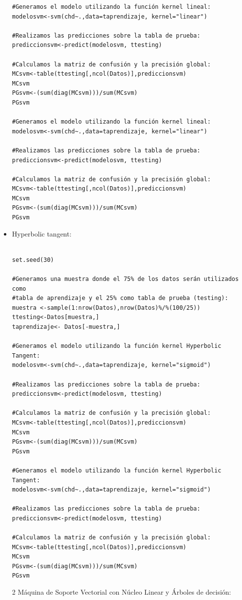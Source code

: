 \documentclass[11pt,a4paper]{report}
\begin{document}
\begin{itemize}
\begin{verbatim}
#Generamos el modelo utilizando la función kernel lineal:
modelosvm<-svm(chd~.,data=taprendizaje, kernel="linear") 

#Realizamos las predicciones sobre la tabla de prueba:
prediccionsvm<-predict(modelosvm, ttesting) 

#Calculamos la matriz de confusión y la precisión global:
MCsvm<-table(ttesting[,ncol(Datos)],prediccionsvm) 
MCsvm
PGsvm<-(sum(diag(MCsvm)))/sum(MCsvm)
PGsvm

#Generamos el modelo utilizando la función kernel lineal:
modelosvm<-svm(chd~.,data=taprendizaje, kernel="linear") 

#Realizamos las predicciones sobre la tabla de prueba:
prediccionsvm<-predict(modelosvm, ttesting) 

#Calculamos la matriz de confusión y la precisión global:
MCsvm<-table(ttesting[,ncol(Datos)],prediccionsvm) 
MCsvm
PGsvm<-(sum(diag(MCsvm)))/sum(MCsvm)
PGsvm

\end{verbatim}
\item Hyperbolic tangent:
\begin{verbatim} 

set.seed(30)

#Generamos una muestra donde el 75% de los datos serán utilizados como 
#tabla de aprendizaje y el 25% como tabla de prueba (testing):
muestra <-sample(1:nrow(Datos),nrow(Datos)%/%(100/25)) 
ttesting<-Datos[muestra,]
taprendizaje<- Datos[-muestra,]

#Generamos el modelo utilizando la función kernel Hyperbolic Tangent:
modelosvm<-svm(chd~.,data=taprendizaje, kernel="sigmoid") 

#Realizamos las predicciones sobre la tabla de prueba:
prediccionsvm<-predict(modelosvm, ttesting) 

#Calculamos la matriz de confusión y la precisión global:
MCsvm<-table(ttesting[,ncol(Datos)],prediccionsvm) 
MCsvm
PGsvm<-(sum(diag(MCsvm)))/sum(MCsvm)
PGsvm

#Generamos el modelo utilizando la función kernel Hyperbolic Tangent:
modelosvm<-svm(chd~.,data=taprendizaje, kernel="sigmoid") 

#Realizamos las predicciones sobre la tabla de prueba:
prediccionsvm<-predict(modelosvm, ttesting) 

#Calculamos la matriz de confusión y la precisión global:
MCsvm<-table(ttesting[,ncol(Datos)],prediccionsvm) 
MCsvm
PGsvm<-(sum(diag(MCsvm)))/sum(MCsvm)
PGsvm

\end{verbatim}
\item[2] Máquina de Soporte Vectorial con Núcleo Linear y Árboles de decisión:
\begin{verbatim}


\end{verbatim}
\end{itemize}
\end{document}
